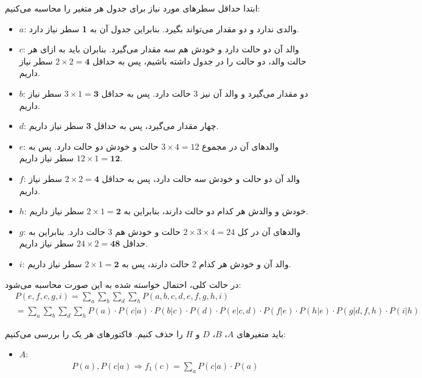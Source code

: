\question{}

\begin{ابجد}
\item ابتدا حداقل سطرهای مورد نیاز برای جدول  هر متغیر را محاسبه می‌کنیم:
\begin{itemize}
    \item $a$: والدی ندارد و دو مقدار می‌تواند بگیرد. بنابراین جدول آن به \textbf{1} سطر نیاز دارد.
    \item $c$: والد آن دو حالت دارد و خودش هم سه مقدار می‌گیرد. بنابران باید به ازای هر حالت والد، دو حالت را در جدول داشته باشیم، پس به حداقل $2 \times 2 = \textbf{4}$ سطر نیاز داریم.
    \item $b$: دو مقدار می‌گیرد و والد آن نیز 3 حالت دارد. پس به حداقل $3 \times 1 = \textbf{3}$ سطر نیاز داریم.
    \item $d$: چهار مقدار می‌گیرد، پس به حداقل \textbf{3} سطر نیاز داریم.
    \item $e$: والدهای آن در مجموع $3 \times 4 = 12$ حالت و خودش دو حالت دارد. پس به $12 \times 1 = \textbf{12}$ سطر نیاز داریم.
    \item $f$: والد آن دو حالت و خودش سه حالت دارد، پس به حداقل $2 \times 2 = \textbf{4}$ سطر نیاز داریم.
    \item $h$: خودش و والدش هر کدام دو حالت دارند، بنابراین به $2 \times 1 = \textbf{2}$ سطر نیاز داریم.
    \item $g$: والدهای آن در کل $2 \times 3 \times 4 = 24$ حالت و خودش هم 3 حالت دارد. بنابراین به حداقل $24 \times 2 = \textbf{48}$ سطر نیاز داریم.
    \item $i$: والد آن و خودش هر کدام 2 حالت دارند، پس به $2 \times 1 = \textbf{2}$ سطر نیاز داریم.
\end{itemize}

\item در حالت کلی، احتمال خواسته شده به این صورت محاسبه می‌شود:
\begin{align*}
     & P(e, f, c, g, i) = \sum_a \sum_b \sum_d \sum_h P(a, b, c, d, e, f, g, h, i)                                                                    \\
     & = \sum_a \sum_b \sum_d \sum_h P(a) \cdot P(c|a) \cdot P(b|c) \cdot P(d) \cdot P(e|c,d) \cdot P(f|e) \cdot P(h|e) \cdot P(g|d,f,h) \cdot P(i|h)
\end{align*}

باید متغیرهای $A$، $B$، $D$ و $H$ را حذف کنیم. فاکتورهای هر یک را بررسی می‌کنیم:
\begin{itemize}
    \item \textbf{$A$}:
          \begin{align*}
              P(a), P(c|a) \Rightarrow f_1(c) = \sum_a P(c|a) \cdot P(a)
          \end{align*}


\end{itemize}
\end{ابجد}
